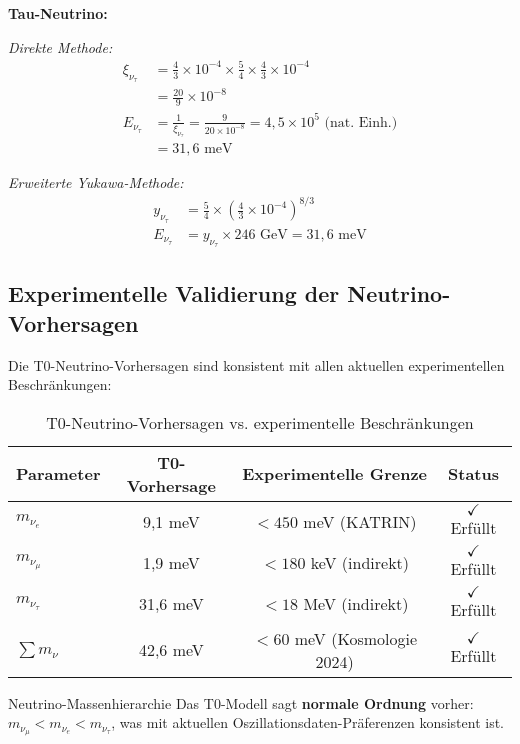 \documentclass[12pt,a4paper]{article}
\begin{document}
	\textbf{Tau-Neutrino:}
	
	\textit{Direkte Methode:}
	\begin{align}
		\xi_{\nu_\tau} &= \frac{4}{3} \times 10^{-4} \times \frac{5}{4} \times \frac{4}{3} \times 10^{-4} \\
		&= \frac{20}{9} \times 10^{-8} \\
		E_{\nu_\tau} &= \frac{1}{\xi_{\nu_\tau}} = \frac{9}{20 \times 10^{-8}} = 4,5 \times 10^5 \text{ (nat. Einh.)} \\
		&= 31,6 \text{ meV}
	\end{align}
	
	\textit{Erweiterte Yukawa-Methode:}
	\begin{align}
		y_{\nu_\tau} &= \frac{5}{4} \times \left(\frac{4}{3} \times 10^{-4}\right)^{8/3} \\
		E_{\nu_\tau} &= y_{\nu_\tau} \times 246 \text{ GeV} = 31,6 \text{ meV}
	\end{align}
	
	\subsection{Experimentelle Validierung der Neutrino-Vorhersagen}
	\label{subsec:neutrino_validation}
	
	Die T0-Neutrino-Vorhersagen sind konsistent mit allen aktuellen experimentellen Beschränkungen:
	
	\begin{table}[H]
		\centering
		\begin{tabular}{lccc}
			\toprule
			\textbf{Parameter} & \textbf{T0-Vorhersage} & \textbf{Experimentelle Grenze} & \textbf{Status} \\
			\midrule
			$m_{\nu_e}$ & 9,1 meV & $< 450$ meV (KATRIN) & $\checkmark$ Erfüllt \\
			$m_{\nu_\mu}$ & 1,9 meV & $< 180$ keV (indirekt) & $\checkmark$ Erfüllt \\
			$m_{\nu_\tau}$ & 31,6 meV & $< 18$ MeV (indirekt) & $\checkmark$ Erfüllt \\
			$\sum m_\nu$ & 42,6 meV & $< 60$ meV (Kosmologie 2024) & $\checkmark$ Erfüllt \\
			\bottomrule
		\end{tabular}
		\caption{T0-Neutrino-Vorhersagen vs. experimentelle Beschränkungen}
		\label{tab:neutrino_validation}
	\end{table}
	
	\begin{important}{Neutrino-Massenhierarchie}{}
		Das T0-Modell sagt \textbf{normale Ordnung} vorher: $m_{\nu_\mu} < m_{\nu_e} < m_{\nu_\tau}$, was mit aktuellen Oszillationsdaten-Präferenzen konsistent ist.
	\end{important}
	
\end{document}
